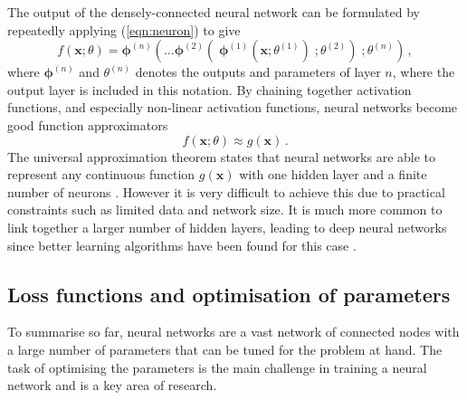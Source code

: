 \documentclass[main.tex]{subfiles}
\begin{document}
    The output of the densely-connected neural network can
    be formulated by repeatedly applying (\ref{eqn:neuron})
    to give
    \begin{equation}\label{eqn:nn_output}
        f(\mathbf{x}; \theta) = \boldsymbol{\phi}^{(n)}(\ldots \boldsymbol{\phi}^{(2)}(\; \boldsymbol{\phi}^{(1)}(\mathbf{x}; \theta^{(1)})\; ; \theta^{(2)}) \; ; \theta^{(n)}) \, ,
    \end{equation}
    where $\boldsymbol{\phi}^{(n)}$ and $\theta^{(n)}$
    denotes the outputs and parameters of layer $n$,
    where the output layer is included in this notation.
    By chaining together activation functions, and especially
    non-linear activation functions, neural networks
    become good function approximators
    \begin{equation}\label{eqn:nn_approx}
        f(\mathbf{x}; \theta) \approx g(\mathbf{x}) \, .
    \end{equation}
    The universal approximation theorem states that neural networks are
    able to represent any continuous function $g(\mathbf{x})$
    with one hidden layer and a finite number of neurons \cite{HORNIK1991251}.
    However it is very difficult to achieve this due to
    practical constraints such as limited data and network size.
    It is much more common to link
    together a larger number of hidden layers, leading
    to deep neural networks since better learning algorithms
    have been found for this case \cite{lu2017expressive}.
    
\subsection{Loss functions and optimisation of parameters}
    To summarise so far, neural networks are a vast network
    of connected nodes with a large number of parameters that
    can be tuned for the problem at hand.
    The task of optimising the parameters is the main challenge
    in training a neural network and is a key area of research.
\end{document}
